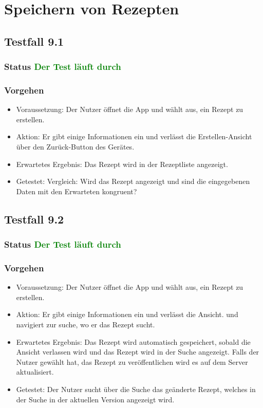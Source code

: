 \section{Speichern von Rezepten}

\subsection{Testfall 9.1}
\subsubsection{Status \textcolor{green}{ Der Test läuft durch} }
\subsubsection{Vorgehen}
\begin{itemize}
\item Voraussetzung: Der Nutzer öffnet die App und wählt aus, ein Rezept zu erstellen. 
\item Aktion: Er gibt einige Informationen ein und verlässt die Erstellen-Ansicht über den Zurück-Button des Gerätes.
\item Erwartetes Ergebnis: Das Rezept wird in der Rezeptliste angezeigt.
\item Getestet: Vergleich: Wird das Rezept angezeigt und sind die eingegebenen Daten mit den Erwarteten kongruent?
\end{itemize}


\subsection{Testfall 9.2}
\subsubsection{Status \textcolor{green}{Der Test läuft durch} }
\subsubsection{Vorgehen}
\begin{itemize}
\item Voraussetzung: Der Nutzer öffnet die App und wählt aus, ein Rezept zu erstellen. 
\item Aktion: Er gibt einige Informationen ein und verlässt die Ansicht. und navigiert zur suche, wo er das Rezept sucht. 
\item Erwartetes Ergebnis: Das Rezept wird automatisch gespeichert, sobald die Ansicht verlassen wird und das Rezept wird in der Suche  angezeigt. Falls der Nutzer gewählt hat, das Rezept zu veröffentlichen wird es auf dem Server aktualisiert. 
\item Getestet: Der Nutzer sucht über die Suche  das geänderte Rezept, welches in der Suche in der aktuellen Version angezeigt wird.  

\end{itemize}



